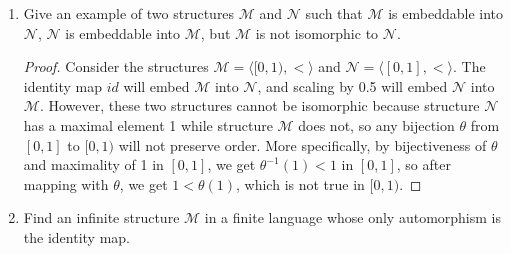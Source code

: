 \documentclass{article}
\begin{document}
\begin{enumerate}
\begin{enumerate}
      \item $\mathcal{M}=\langle\mathbb{N}\setminus\{0\},\cdot,1\rangle$ and
        $\mathcal{N}=\langle\mathbb{N},+,0\rangle$
        \begin{proof}
          No such embedding exists. Assume that an embedding
          $\alpha:\mathbb{N}\hookrightarrow\mathbb{N}$ exists. Since
          embeddings preserve function maps, we can prove by induction on
          $k$ that for any $n\in\mathbb{N}\setminus\{0\}$,
          $\alpha(n^k)=k\cdot \alpha(n)$.  Let $m=\alpha(2)$ and
          $n=\alpha(3)$. Note that $m\neq0$ and $n\neq0$ since
          $\alpha(1)=0$ and $\alpha$ is injective. Then $\alpha(2^n)=n\cdot
          m=m\cdot n=\alpha(3^m)$, yet $2^n\neq3^m$ since $m,n\neq0$,
          contradicting the injectiveness of $\alpha$.
        \end{proof}
    \end{enumerate}

  \item Give an example of two structures $\mathcal{M}$ and $\mathcal{N}$
    such that $\mathcal{M}$ is embeddable into $\mathcal{N}$, $\mathcal{N}$
    is embeddable into $\mathcal{M}$, but $\mathcal{M}$ is not isomorphic
    to $\mathcal{N}$.

    \begin{proof}
      Consider the structures
      $\mathcal{M}=\langle[0,1),<\rangle$ and
      $\mathcal{N}=\langle[0,1],<\rangle$. The identity
      map $id$ will embed $\mathcal{M}$ into $\mathcal{N}$, and scaling by
      0.5 will embed $\mathcal{N}$ into $\mathcal{M}$. However, these two
      structures cannot be isomorphic because structure $\mathcal{N}$ has a
      maximal element 1 while structure $\mathcal{M}$ does not, so any
      bijection $\theta$ from $[0,1]$ to $[0,1)$ will not preserve order.
      More specifically, by bijectiveness of $\theta$ and maximality of 1
      in $[0,1]$, we get $\theta^{-1}(1)<1$ in $[0,1]$, so after
      mapping with $\theta$, we get $1<\theta(1)$, which is not true in
      $[0,1)$.
    \end{proof}

  \item Find an infinite structure $\mathcal{M}$ in a finite language whose
    only automorphism is the identity map.


\end{enumerate}
\end{document}
